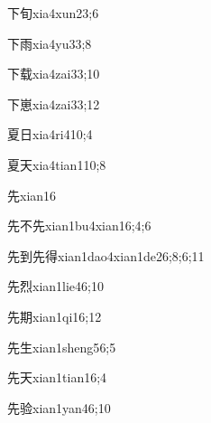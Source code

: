 \begin{verbete}{下旬}{xia4xun2}{3;6}
\end{verbete}
\begin{verbete}{下雨}{xia4yu3}{3;8}
\end{verbete}
\begin{verbete}{下载}{xia4zai3}{3;10}
\end{verbete}
\begin{verbete}{下崽}{xia4zai3}{3;12}
\end{verbete}
\begin{verbete}{夏日}{xia4ri4}{10;4}
\end{verbete}
\begin{verbete}{夏天}{xia4tian1}{10;8}
\end{verbete}
\begin{verbete}{先}{xian1}{6}
\end{verbete}
\begin{verbete}{先不先}{xian1bu4xian1}{6;4;6}
\end{verbete}
\begin{verbete}{先到先得}{xian1dao4xian1de2}{6;8;6;11}
\end{verbete}
\begin{verbete}{先烈}{xian1lie4}{6;10}
\end{verbete}
\begin{verbete}{先期}{xian1qi1}{6;12}
\end{verbete}
\begin{verbete}{先生}{xian1sheng5}{6;5}
\end{verbete}
\begin{verbete}{先天}{xian1tian1}{6;4}
\end{verbete}
\begin{verbete}{先验}{xian1yan4}{6;10}
\end{verbete}
